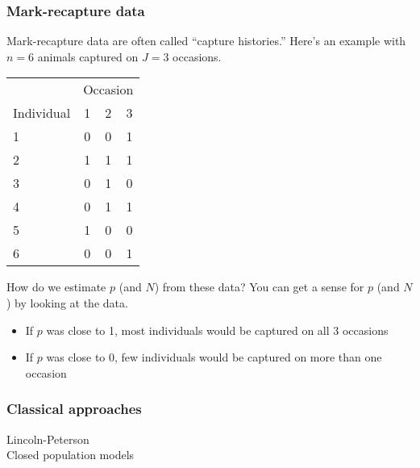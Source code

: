 \documentclass[color=usenames,dvipsnames]{beamer}\usepackage[]{graphicx}\usepackage[]{color}
\begin{document}
\begin{frame}
  \frametitle{Mark-recapture data}
  \small
  Mark-recapture data are often called ``capture histories.'' Here's
  an example with $n=6$ animals captured on $J=3$ occasions. \\
  \centering
  \begin{tabular}{lccc}
    \hline
    & \multicolumn{3}{c}{Occasion} \\
    \cline{2-4}
    Individual & 1 & 2 & 3 \\
    \hline
    1 & 0 & 0 & 1 \\
    2 & 1 & 1 & 1 \\
    3 & 0 & 1 & 0 \\
    4 & 0 & 1 & 1 \\
    5 & 1 & 0 & 0 \\
    6 & 0 & 0 & 1 \\
    \hline
  \end{tabular}
  \pause
  \vfill
  \flushleft
  How do we estimate $p$ (and $N$) from these data? %
  \pause
  You can get a sense for $p$ (and $N$) by looking at the data.
  \begin{itemize}
    \setlength\itemsep{.1pt}
    \item If $p$ was close to 1, most individuals would be captured
      on all 3 occasions
    \item If $p$ was close to 0, few individuals would be captured on
      more than one occasion
  \end{itemize}
\end{frame}









\begin{frame}
  \frametitle{Classical approaches}
  Lincoln-Peterson  \\
  \pause
  \vfill
  Closed population models \\
\end{frame}
\end{document}
